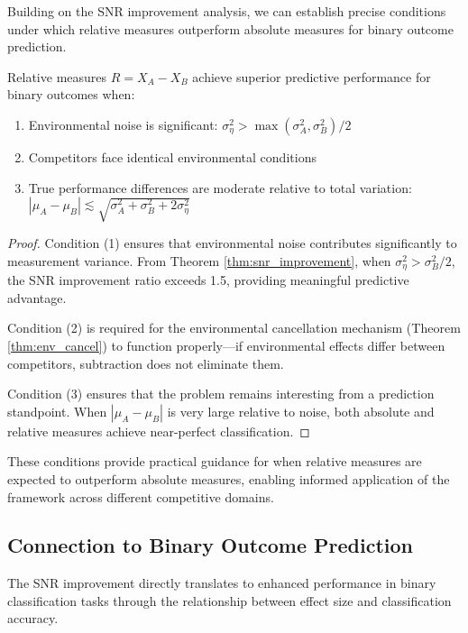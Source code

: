 Building on the SNR improvement analysis, we can establish precise conditions under which relative measures outperform absolute measures for binary outcome prediction.

\begin{theorem}
\label{thm:relative_superiority}
Relative measures $R = X_A - X_B$ achieve superior predictive performance for binary outcomes when:
\begin{enumerate}
\item Environmental noise is significant: $\sigma_\eta^2 > \max(\sigma_A^2, \sigma_B^2)/2$
\item Competitors face identical environmental conditions
\item True performance differences are moderate relative to total variation: $|\mu_A - \mu_B| \lesssim \sqrt{\sigma_A^2 + \sigma_B^2 + 2\sigma_\eta^2}$
\end{enumerate}
\end{theorem}

\begin{proof}
Condition (1) ensures that environmental noise contributes significantly to measurement variance. From Theorem \ref{thm:snr_improvement}, when $\sigma_\eta^2 > \sigma_B^2/2$, the SNR improvement ratio exceeds 1.5, providing meaningful predictive advantage.

Condition (2) is required for the environmental cancellation mechanism (Theorem \ref{thm:env_cancel}) to function properly—if environmental effects differ between competitors, subtraction does not eliminate them.

Condition (3) ensures that the problem remains interesting from a prediction standpoint. When $|\mu_A - \mu_B|$ is very large relative to noise, both absolute and relative measures achieve near-perfect classification.
\end{proof}

These conditions provide practical guidance for when relative measures are expected to outperform absolute measures, enabling informed application of the framework across different competitive domains.

\subsection{Connection to Binary Outcome Prediction}

The SNR improvement directly translates to enhanced performance in binary classification tasks through the relationship between effect size and classification accuracy.


